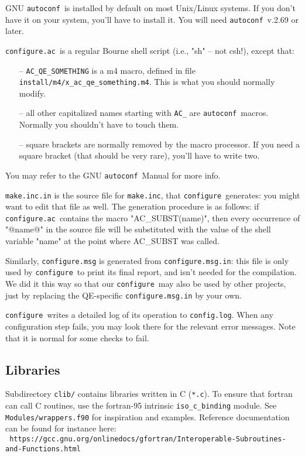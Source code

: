 \documentclass[12pt,a4paper]{article}
\def\qe{QE}
\def\configure{\texttt{configure}}
\def\configurac{\texttt{configure.ac}}
\def\autoconf{\texttt{autoconf}}
\def\make.inc{\texttt{make.inc}}
\begin{document}
GNU \autoconf\ is installed by default on most Unix/Linux systems.  If
you don't have it on your system, you'll have to install it. You will
need \autoconf\ v.2.69 or later.

\configurac\ is a regular Bourne shell script (i.e., "sh" -- not csh!),
except that:
\begin{itemize}
\item[--] \texttt{AC\_QE\_SOMETHING} is a m4 macro, defined in file
  \texttt{install/m4/x\_ac\_qe\_something.m4}. This is what you should
  normally modify.
\item[--] all other capitalized names starting with \texttt{AC\_} are
  \autoconf\ macros.  Normally you shouldn't have to touch them.
\item[--] square brackets are normally removed by the macro processor.
  If you need a square bracket (that should be very rare), you'll have
  to write two.
\end{itemize}

You may refer to the GNU \autoconf\ Manual for more info.

\texttt{make.inc.in} is the source file for \make.inc, that
\configure\ generates: you might want to edit that file as well.
The generation procedure is as follows: if \configurac\ contains the macro
"AC\_SUBST(name)", then every occurrence of "@name@" in the source
file will be substituted with the value of the shell variable "name"
at the point where AC\_SUBST was called.

Similarly, \configure\texttt{.msg} is generated from \configure\texttt{.msg.in}: this
file is only used by \configure\ to print its final report, and isn't
needed for the compilation.  We did it this way so that our
\configure\ may also be used by other projects, just by replacing the
\qe-specific \configure\texttt{.msg.in} by your own.

\configure\ writes a detailed log of its operation to \texttt{config.log}.
When any configuration step fails, you may look there for the relevant
error messages.  Note that it is normal for some checks to fail.


\subsection{Libraries}

Subdirectory \texttt{clib/} contains libraries written in C
(\texttt{*.c}). To ensure that fortran can call C routines,
use the fortran-95 intrinsic \texttt{iso\_c\_binding} module.
See \texttt{Modules/wrappers.f90} for inspiration and examples.
Reference documentation can be found for instance here:\\
{\tt
https://gcc.gnu.org/onlinedocs/gfortran/Interoperable-Subroutines-and-Functions.html}
\end{document}
